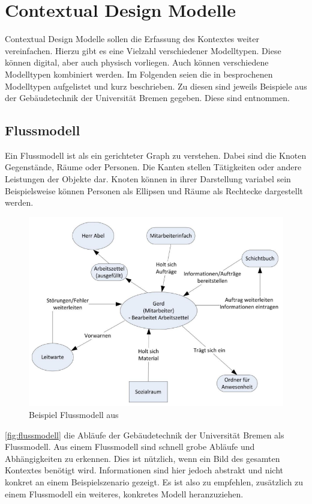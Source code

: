 \section{Contextual Design Modelle}\label{sec:modelle}

Contextual Design Modelle sollen die Erfassung des Kontextes weiter vereinfachen.
Hierzu gibt es eine Vielzahl verschiedener Modelltypen.
Diese können digital, aber auch physisch vorliegen.
Auch können verschiedene Modelltypen kombiniert werden.
Im Folgenden seien die in \cite{NOG} besprochenen Modelltypen aufgelistet und kurz beschrieben.
Zu diesen sind jeweils Beispiele aus der Gebäudetechnik der Universität Bremen gegeben.
Diese sind \cite{NOG} entnommen.

\subsection{Flussmodell}

Ein Flussmodell ist als ein gerichteter Graph zu verstehen.
Dabei sind die Knoten Gegenstände, Räume oder Personen.
Die Kanten stellen Tätigkeiten oder andere Leistungen der Objekte dar.
Knoten können in ihrer Darstellung variabel sein
Beispielsweise können Personen als Ellipsen und Räume als Rechtecke dargestellt werden.

\begin{figure}[htp]
    \centering
    \includegraphics[width=.7\textwidth]{images/3-Modelle/flussmodell.png}
    \caption{Beispiel Flussmodell aus \cite{NOG}}
    \label{fig:flussmodell}
\end{figure}

\autoref{fig:flussmodell} die Abläufe der Gebäudetechnik der Universität Bremen als Flussmodell.
Aus einem Flussmodell sind schnell grobe Abläufe und Abhängigkeiten zu erkennen.
Dies ist nützlich, wenn ein Bild des gesamten Kontextes benötigt wird.
Informationen sind hier jedoch abstrakt und nicht konkret an einem Beispielszenario gezeigt.
Es ist also zu empfehlen, zusätzlich zu einem Flussmodell ein weiteres, konkretes Modell heranzuziehen.

